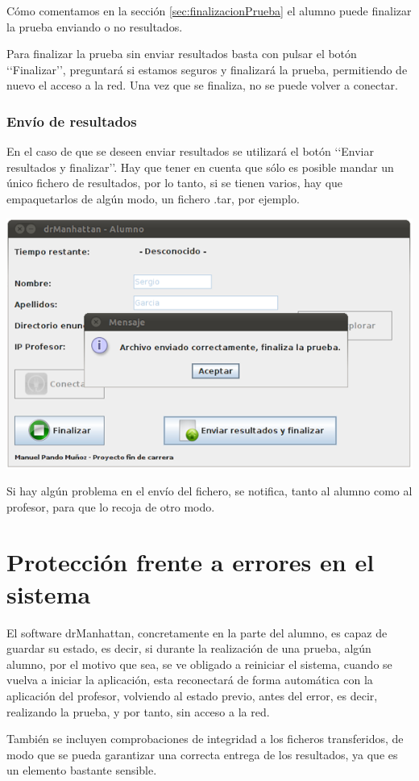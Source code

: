 \documentclass[11pt]{article}
\begin{document}
Cómo comentamos en la sección \ref{sec:finalizacionPrueba} el alumno puede finalizar la prueba enviando o no resultados.

Para finalizar la prueba sin enviar resultados basta con pulsar el botón \lq\lq Finalizar\rq\rq, preguntará si estamos seguros y finalizará la prueba, permitiendo de nuevo el acceso a la red. Una vez que se finaliza, no se puede volver a conectar.

\subsubsection{Envío de resultados}
\label{sec:finResultados}

En el caso de que se deseen enviar resultados se utilizará el botón \lq\lq Enviar resultados y finalizar\rq\rq. Hay que tener en cuenta que sólo es posible mandar un único fichero de resultados, por lo tanto, si se tienen varios, hay que empaquetarlos de algún modo, un fichero .tar, por ejemplo.

\begin{center}
    \includegraphics[width=.90\linewidth]{imagenes/finResCorrecto}
\end{center}

Si hay algún problema en el envío del fichero, se notifica, tanto al alumno como al profesor, para que lo recoja de otro modo.


\newpage
\section{Protección frente a errores en el sistema}

El software drManhattan, concretamente en la parte del alumno, es capaz de guardar su estado, es decir, si durante la realización de una prueba, algún alumno, por el motivo que sea, se ve obligado a reiniciar el sistema, cuando se vuelva a iniciar la aplicación, esta reconectará de forma automática con la aplicación del profesor, volviendo al estado previo, antes del error, es decir, realizando la prueba, y por tanto, sin acceso a la red.
\newline

También se incluyen comprobaciones de integridad a los ficheros transferidos, de modo que  se pueda garantizar una correcta entrega de los resultados, ya que es un elemento bastante sensible.
\end{document}
